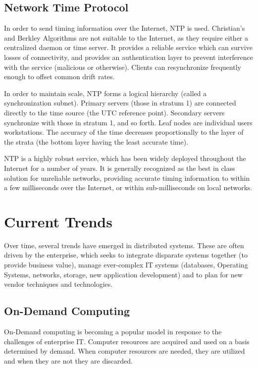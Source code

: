 \documentclass{article}
\begin{document}
\subsection{Network Time Protocol}
In order to send timing information over the Internet, NTP is used. Christian's and Berkley Algorithms are not suitable to the Internet, as they require either a centralized daemon or time server. It provides a reliable service which can survive losses of connectivity, and provides an authentication layer to prevent interference with the service (malicious or otherwise). Clients can resynchronize frequently enough to offset common drift rates.

In order to maintain scale, NTP forms a logical hierarchy (called a synchronization subnet). Primary servers (those in stratum 1) are connected directly to the time source (the UTC reference point). Secondary servers synchronize with those in stratum 1, and so forth. Leaf nodes are individual users workstations. The accuracy of the time decreases proportionally to the layer of the strata (the bottom layer having the least accurate time). 

NTP is a highly robust service, which has been widely deployed throughout the Internet for a number of years. It is generally recognized as the best in class solution for unreliable networks, providing accurate timing information to within a few milliseconds over the Internet, or within sub-milliseconds on local networks.

\section{Current Trends}
Over time, several trends have emerged in distributed systems. These are often driven by the enterprise, which seeks to integrate disparate systems together (to provide business value), manage ever-complex IT systems (databases, Operating Systems, networks, storage, new application development) and to plan for new vendor techniques and technologies.

\subsection{On-Demand Computing}
On-Demand computing is becoming a popular model in response to the challenges of enterprise IT. Computer resources are acquired and used on a basis determined by demand. When computer resources are needed, they are utilized and when they are not they are discarded. 
\end{document}
